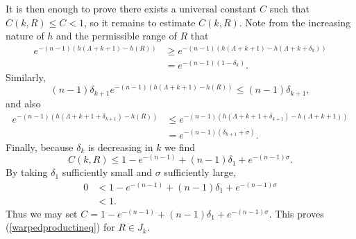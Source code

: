 \documentclass{amsart}
\theoremstyle{definition}
\theoremstyle{remark}
\numberwithin{equation}{section}
\begin{document}
It is then enough to prove there exists a universal constant $C$ such that $C(k,R)\leq C<1$, so it remains to estimate $C(k,R)$. Note from the increasing nature of $h$ and the permissible range of $R$ that
\begin{align*}
e^{-(n-1)(h(\Lambda+k+1)-h(R))}&\geq e^{-(n-1)(h(\Lambda+k+1)-h(\Lambda+k+\delta_k))}\\
&=e^{-(n-1)(1-\delta_k)}.
\end{align*}
Similarly,
\begin{equation*}
(n-1)\delta_{k+1}e^{-(n-1)(h(\Lambda+k+1)-h(R))}\leq (n-1)\delta_{k+1},
\end{equation*}
and also
\begin{align*}
e^{-(n-1)(h(\Lambda+k+1+\delta_{k+1})-h(R))}&\leq e^{-(n-1)(h(\Lambda+k+1+\delta_{k+1})-h(\Lambda+k+1))}\\
&=e^{-(n-1)(\delta_{k+1}+\sigma)}.
\end{align*}
Finally, because $\delta_k$ is decreasing in $k$ we find
\begin{equation*}
C(k,R)\leq 1-e^{-(n-1)}+(n-1)\delta_1+e^{-(n-1)\sigma}.
\end{equation*}
By taking $\delta_1$ sufficiently small and $\sigma$ sufficiently large, 
\begin{align*}
0&<1-e^{-(n-1)}+(n-1)\delta_1+e^{-(n-1)\sigma}\\
&<1.
\end{align*}
Thus we may set $C=1-e^{-(n-1)}+(n-1)\delta_1+e^{-(n-1)\sigma}$. This proves (\ref{warpedproductineq}) for $R\in J_k$.
\end{document}
